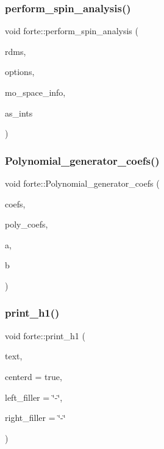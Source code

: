 \subsubsection{\texorpdfstring{perform\+\_\+spin\+\_\+analysis()}{perform\_spin\_analysis()}}
{\footnotesize\ttfamily void forte\+::perform\+\_\+spin\+\_\+analysis (\begin{DoxyParamCaption}\item[{\mbox{\hyperlink{classforte_1_1_r_d_ms}{R\+D\+Ms}}}]{rdms,  }\item[{std\+::shared\+\_\+ptr$<$ \mbox{\hyperlink{classforte_1_1_forte_options}{Forte\+Options}} $>$}]{options,  }\item[{std\+::shared\+\_\+ptr$<$ \mbox{\hyperlink{classforte_1_1_m_o_space_info}{M\+O\+Space\+Info}} $>$}]{mo\+\_\+space\+\_\+info,  }\item[{std\+::shared\+\_\+ptr$<$ \mbox{\hyperlink{classforte_1_1_active_space_integrals}{Active\+Space\+Integrals}} $>$}]{as\+\_\+ints }\end{DoxyParamCaption})}

\mbox{\label{namespaceforte_a35a73b6c34213712ad88a24d62012a4d}} 
\subsubsection{\texorpdfstring{Polynomial\+\_\+generator\+\_\+coefs()}{Polynomial\_generator\_coefs()}}
{\footnotesize\ttfamily void forte\+::\+Polynomial\+\_\+generator\+\_\+coefs (\begin{DoxyParamCaption}\item[{std\+::vector$<$ double $>$ \&}]{coefs,  }\item[{std\+::vector$<$ double $>$ \&}]{poly\+\_\+coefs,  }\item[{double}]{a,  }\item[{double}]{b }\end{DoxyParamCaption})}

\mbox{\label{namespaceforte_a5d72fc4d0f690163ec44d8c21eea5846}} 
\subsubsection{\texorpdfstring{print\+\_\+h1()}{print\_h1()}}
{\footnotesize\ttfamily void forte\+::print\+\_\+h1 (\begin{DoxyParamCaption}\item[{const std\+::string \&}]{text,  }\item[{bool}]{centerd = {\ttfamily true},  }\item[{const std\+::string \&}]{left\+\_\+filler = {\ttfamily \char`\"{}-\/\char`\"{}},  }\item[{const std\+::string \&}]{right\+\_\+filler = {\ttfamily \char`\"{}-\/\char`\"{}} }\end{DoxyParamCaption})}



